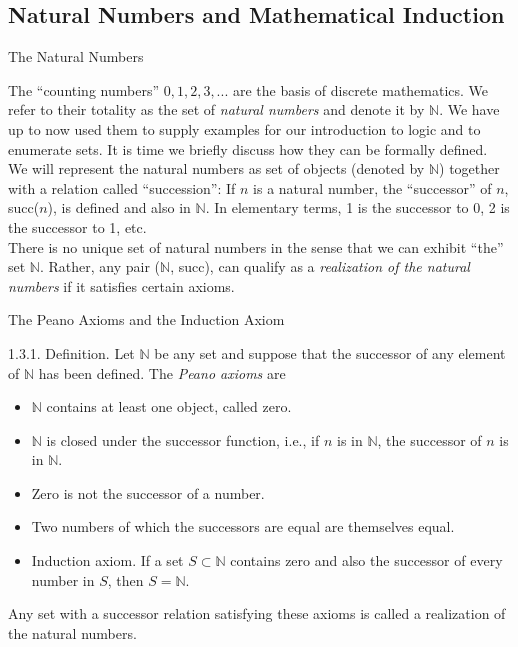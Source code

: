 \documentclass[smaller,hyperref={CJKbookmarks=true}]{beamer}
\newcommand{\N}{\mathbb{N}} \newcommand{\Z}{\mathbb{Z}} \newcommand{\Q}{\mathbb{Q}}
\begin{document}
\subsection{Natural Numbers and Mathematical Induction}
\begin{frame}[c] \begin{spacing}{2}
\tableofcontents[sectionstyle=hide,subsectionstyle=show/shaded/hide]
\end{spacing}
\end{frame}
\begin{frame}[c]{The Natural Numbers}
\begin{spacing}{1.1}
The ``counting numbers'' $0,1,2,3,...$ are the basis of discrete mathematics. We refer to their totality as the set of \emph{natural numbers} and denote it by $\N$. We have up to now used them to supply examples for our introduction to logic and to enumerate sets. It is time we briefly discuss how they can be formally defined.\\[6pt]
We will represent the natural numbers as set of objects (denoted by $\N$) together with a relation called ``succession'': If $n$ is a natural number, the ``successor'' of $n$, succ($n$), is defined and also in $\N$. In elementary terms, 1 is the successor to 0, 2 is the successor to 1, etc.\\[6pt]
There is no unique set of natural numbers in the sense that we can exhibit ``the'' set $\N$. Rather, any pair ($\N$, succ), can qualify as a \emph{realization of the natural numbers} if it satisfies certain axioms.
\end{spacing}
\end{frame}
\begin{frame}[c]{The Peano Axioms and the Induction Axiom}
\begin{spacing}{1.1}
\alert{1.3.1. Definition.} Let $\N$ be any set and suppose that the successor of any element of $\N$ has been defined. The \emph{Peano axioms} are
\begin{itemize}
  \item[1.] $\N$ contains at least one object, called zero.
  \item[2.] $\N$ is closed under the successor function, i.e., if $n$ is in $\N$, the successor of $n$ is in $\N$.
  \item[3.] Zero is not the successor of a number.
  \item[4.] Two numbers of which the successors are equal are themselves equal.
  \item[5.] \alert{Induction axiom.} If a set $S\subset\N$ contains zero and also the successor of every number in $S$, then $S=\N$.
\end{itemize}
Any set with a successor relation satisfying these axioms is called a
realization of the natural numbers.
\end{spacing}
\end{frame}
\end{document}
